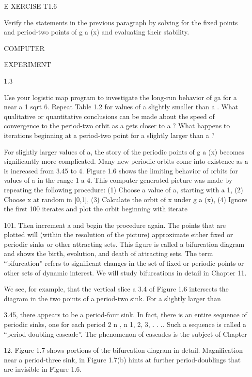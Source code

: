 \documentclass[12pt]{article}
\begin{document}
 

E XERCISE T1.6

Verify the statements in the previous paragraph by solving for the fixed points and period-two points of g 
a (x) and evaluating their stability.


COMPUTER

EXPERIMENT

1.3

Use your logistic map program to investigate the long-run behavior of ga  for a near a   1 sqrt 6. Repeat 
Table 1.2 for values of a slightly smaller than a  . What qualitative or quantitative conclusions can be 
made about the speed of convergence to the period-two orbit as a gets closer to a  ? What happens to 
iterations beginning at a period-two point for a slightly larger than a  ?

For slightly larger values of a, the story of the periodic points of g a (x) becomes significantly more 
complicated. Many new periodic orbits come into existence as a is increased from 3.45 to 4. Figure 1.6 
shows the limiting behavior of orbits for values of a in the range 1   a  4. This computer-generated 
picture was made by repeating the following procedure: (1) Choose a value of a, starting with a  1, (2) 
Choose x at random in [0,1], (3) Calculate the orbit of x under g a (x), (4) Ignore the first 100 iterates 
and plot the orbit beginning with iterate

101. Then increment a and begin the procedure again. The points that are plotted will (within the 
resolution of the picture) approximate either fixed or periodic sinks or other attracting sets. This figure 
is called a bifurcation diagram and shows the birth, evolution, and death of attracting sets. The term 
“bifurcation” refers to significant changes in the set of fixed or periodic points or other sets of dynamic 
interest. We will study bifurcations in detail in Chapter 11.

We see, for example, that the vertical slice a  3.4 of Figure 1.6 intersects the diagram in the two points 
of a period-two sink. For a slightly larger than

3.45, there appears to be a period-four sink. In fact, there is an entire sequence of periodic sinks, one 
for each period 2 n , n  1, 2, 3, . . .. Such a sequence is called a “period-doubling cascade”. The 
phenomenon of cascades is the subject of Chapter

12. Figure 1.7 shows portions of the bifurcation diagram in detail. Magnification near a period-three sink, 
in Figure 1.7(b) hints at further period-doublings that are invisible in Figure 1.6.
\end{document}
